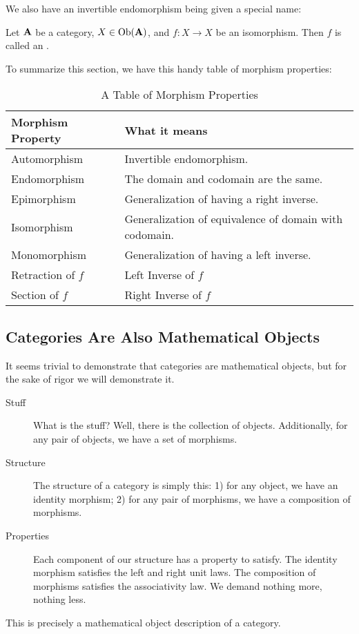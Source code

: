 We also have an invertible endomorphism being given a special name:

\begin{defn}%
Let $\mathbf{A}$ be a category, $X\in\operatorname{Ob}(\mathbf{A})$, and $f:X\to
X$ be an isomorphism. Then $f$ is called an .
\end{defn}

To summarize this section, we have this handy table of morphism
properties: 

\begin{table}[H]
\begin{tabular}{| p{3.5cm} | p{6cm} |}
\hline
\textbf{Morphism Property} & \textbf{What it means}\\\hline
Automorphism & Invertible endomorphism. \\\hline
Endomorphism & The domain and codomain are the same.\\ \hline
Epimorphism & Generalization of having a right inverse.\\ \hline
Isomorphism & Generalization of equivalence of domain with codomain.\\\hline
Monomorphism & Generalization of having a left inverse.\\ \hline
Retraction of $f$ & Left Inverse of $f$\\ \hline
Section of $f$ & Right Inverse of $f$\\\hline
\end{tabular}
\caption{A Table of Morphism Properties}\label{tab:morphisms}
\end{table}

\subsection{Categories Are Also Mathematical Objects} 

It seems trivial to demonstrate that categories are mathematical
objects, but for the sake of rigor we will demonstrate it. 
\begin{description}
\item[Stuff] What is the stuff? Well, there is the collection of
  objects. Additionally, for any pair of objects, we have a set
  of morphisms.
\item[Structure] The structure of a category is simply this: 1) for
  any object, we have an identity morphism; 2) for any pair of
  morphisms, we have a composition of morphisms.
\item[Properties] Each component of our structure has a property
  to satisfy. The identity morphism satisfies the left and right
  unit laws. The composition of morphisms satisfies the
  associativity law. We demand nothing more, nothing less.
\end{description}
\noindent This is precisely a mathematical object description of
a category.

